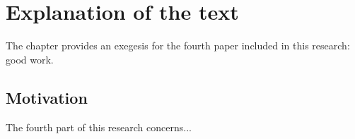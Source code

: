 

\section{Explanation of the text}

The chapter provides an exegesis for the fourth paper included in this research: good work.

\subsection{Motivation}
The fourth part of this research concerns...



